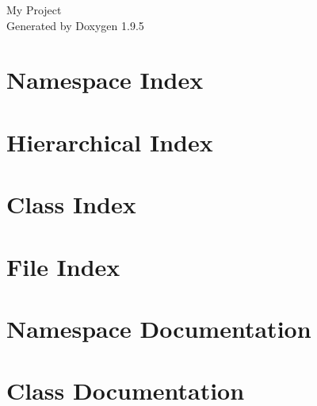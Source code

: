\documentclass[twoside]{book}
\newcommand{\+}{\discretionary{\mbox{\scriptsize$\hookleftarrow$}}{}{}}
\newcommand{\clearemptydoublepage}{%
    \newpage{\pagestyle{empty}\cleardoublepage}%
  }
\begin{document}
  \raggedbottom
    \hypersetup{pageanchor=false,
                bookmarksnumbered=true,
                pdfencoding=unicode
               }
  \begin{titlepage}
  \vspace*{7cm}
  \begin{center}%
  {\Large My Project}\\
  \vspace*{1cm}
  {\large Generated by Doxygen 1.9.5}\\
  \end{center}
  \end{titlepage}
  \clearemptydoublepage
  \tableofcontents
  \clearemptydoublepage
  \hypersetup{pageanchor=true}
\chapter{Namespace Index}

\chapter{Hierarchical Index}

\chapter{Class Index}

\chapter{File Index}

\chapter{Namespace Documentation}



\chapter{Class Documentation}

























\end{document}
